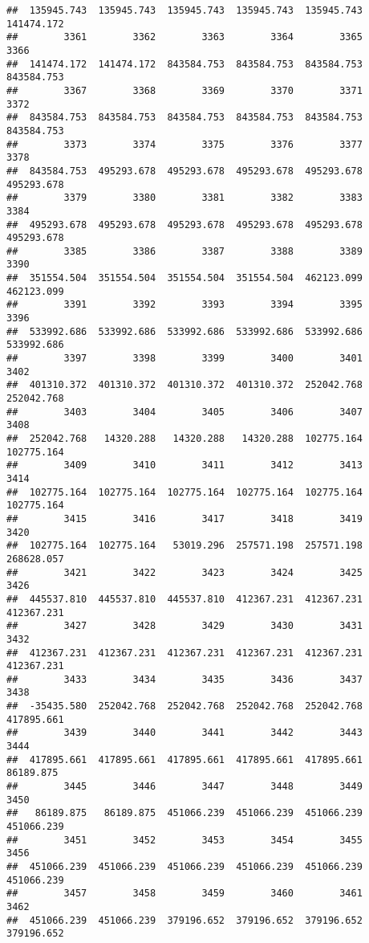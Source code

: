 \documentclass[
]{book}
\begin{document}
\begin{verbatim}
##  135945.743  135945.743  135945.743  135945.743  135945.743  141474.172 
##        3361        3362        3363        3364        3365        3366 
##  141474.172  141474.172  843584.753  843584.753  843584.753  843584.753 
##        3367        3368        3369        3370        3371        3372 
##  843584.753  843584.753  843584.753  843584.753  843584.753  843584.753 
##        3373        3374        3375        3376        3377        3378 
##  843584.753  495293.678  495293.678  495293.678  495293.678  495293.678 
##        3379        3380        3381        3382        3383        3384 
##  495293.678  495293.678  495293.678  495293.678  495293.678  495293.678 
##        3385        3386        3387        3388        3389        3390 
##  351554.504  351554.504  351554.504  351554.504  462123.099  462123.099 
##        3391        3392        3393        3394        3395        3396 
##  533992.686  533992.686  533992.686  533992.686  533992.686  533992.686 
##        3397        3398        3399        3400        3401        3402 
##  401310.372  401310.372  401310.372  401310.372  252042.768  252042.768 
##        3403        3404        3405        3406        3407        3408 
##  252042.768   14320.288   14320.288   14320.288  102775.164  102775.164 
##        3409        3410        3411        3412        3413        3414 
##  102775.164  102775.164  102775.164  102775.164  102775.164  102775.164 
##        3415        3416        3417        3418        3419        3420 
##  102775.164  102775.164   53019.296  257571.198  257571.198  268628.057 
##        3421        3422        3423        3424        3425        3426 
##  445537.810  445537.810  445537.810  412367.231  412367.231  412367.231 
##        3427        3428        3429        3430        3431        3432 
##  412367.231  412367.231  412367.231  412367.231  412367.231  412367.231 
##        3433        3434        3435        3436        3437        3438 
##  -35435.580  252042.768  252042.768  252042.768  252042.768  417895.661 
##        3439        3440        3441        3442        3443        3444 
##  417895.661  417895.661  417895.661  417895.661  417895.661   86189.875 
##        3445        3446        3447        3448        3449        3450 
##   86189.875   86189.875  451066.239  451066.239  451066.239  451066.239 
##        3451        3452        3453        3454        3455        3456 
##  451066.239  451066.239  451066.239  451066.239  451066.239  451066.239 
##        3457        3458        3459        3460        3461        3462 
##  451066.239  451066.239  379196.652  379196.652  379196.652  379196.652 

\end{verbatim}
\end{document}
